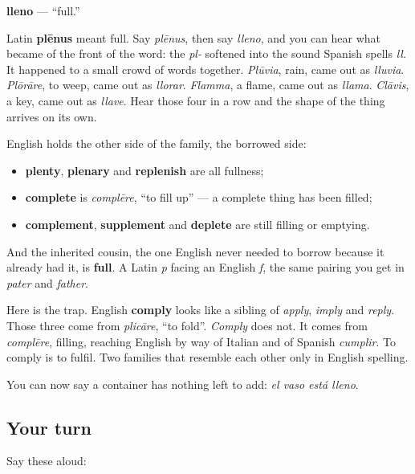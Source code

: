 \begin{cousinweb}
\textbf{lleno} — \textquotedblleft{}full.\textquotedblright{}

Latin \textbf{plēnus} meant full. Say \emph{plēnus}, then say \emph{lleno}, and you can hear what became of the front of the word: the \emph{pl-} softened into the sound Spanish spells \emph{ll}. It happened to a small crowd of words together. \emph{Plūvia}, rain, came out as \emph{lluvia}. \emph{Plōrāre}, to weep, came out as \emph{llorar}. \emph{Flamma}, a flame, came out as \emph{llama}. \emph{Clāvis}, a key, came out as \emph{llave}. Hear those four in a row and the shape of the thing arrives on its own.

English holds the other side of the family, the borrowed side:

\begin{itemize}
\raggedright
  \item \textbf{plenty}, \textbf{plenary} and \textbf{replenish} are all fullness;
  \item \textbf{complete} is \emph{complēre}, \textquotedblleft{}to fill up\textquotedblright{} — a complete thing has been filled;
  \item \textbf{complement}, \textbf{supplement} and \textbf{deplete} are still filling or emptying.
\end{itemize}

And the inherited cousin, the one English never needed to borrow because it already had it, is \textbf{full}. A Latin \emph{p} facing an English \emph{f}, the same pairing you get in \emph{pater} and \emph{father}.

Here is the trap. English \textbf{comply} looks like a sibling of \emph{apply}, \emph{imply} and \emph{reply}. Those three come from \emph{plicāre}, \textquotedblleft{}to fold\textquotedblright{}. \emph{Comply} does not. It comes from \emph{complēre}, filling, reaching English by way of Italian and of Spanish \emph{cumplir}. To comply is to fulfil. Two families that resemble each other only in English spelling.
\end{cousinweb}

\begin{grammarlens}[title={What you've built}]
You can now say a container has nothing left to add: \emph{el vaso está lleno}.
\end{grammarlens}

\subsection*{Your turn}
Say these aloud:

